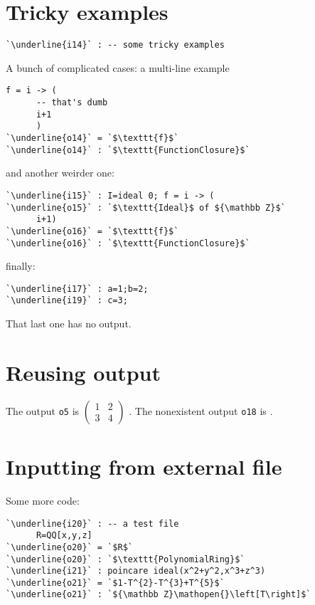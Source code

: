 \documentclass[12pt,a4paper]{amsart}
\begin{document}
\section{Tricky examples}
\begin{lstlisting}[language=Macaulay2]
`\underline{i14}` : -- some tricky examples\end{lstlisting}
A bunch of complicated cases: a multi-line example
\begin{lstlisting}[language=Macaulay2]
      f = i -> (
      -- that's dumb
      i+1
      )
`\underline{o14}` = `$\texttt{f}$`
`\underline{o14}` : `$\texttt{FunctionClosure}$`\end{lstlisting}
and another weirder one:
\begin{lstlisting}[language=Macaulay2]
`\underline{i15}` : I=ideal 0; f = i -> (
`\underline{o15}` : `$\texttt{Ideal}$ of ${\mathbb Z}$`
      i+1)
`\underline{o16}` = `$\texttt{f}$`
`\underline{o16}` : `$\texttt{FunctionClosure}$`\end{lstlisting}
finally:
\begin{lstlisting}[language=Macaulay2]
`\underline{i17}` : a=1;b=2;
`\underline{i19}` : c=3;\end{lstlisting}
That last one has no output.

\section{Reusing output}
The output {\tt o5} is $\left(\!\begin{array}{cc}
1&2\\
3&4
\end{array}\!\right)$%
.
The nonexistent output {\tt o18} is %
.

\section{Inputting from external file}
Some more code:
\begin{lstlisting}[language=Macaulay2]
`\underline{i20}` : -- a test file
      R=QQ[x,y,z]
`\underline{o20}` = `$R$`
`\underline{o20}` : `$\texttt{PolynomialRing}$`
`\underline{i21}` : poincare ideal(x^2+y^2,x^3+z^3)
`\underline{o21}` = `$1-T^{2}-T^{3}+T^{5}$`
`\underline{o21}` : `${\mathbb Z}\mathopen{}\left[T\right]$`\end{lstlisting}
\end{document}
